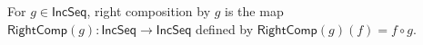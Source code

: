 \begin{definition}
For $g\in\mathsf{IncSeq}$, right composition by $g$ is the map
$\mathsf{RightComp}(g):\mathsf{IncSeq}\to\mathsf{IncSeq}$ defined by
$\mathsf{RightComp}(g)(f)=f\circ g$.
\end{definition}
